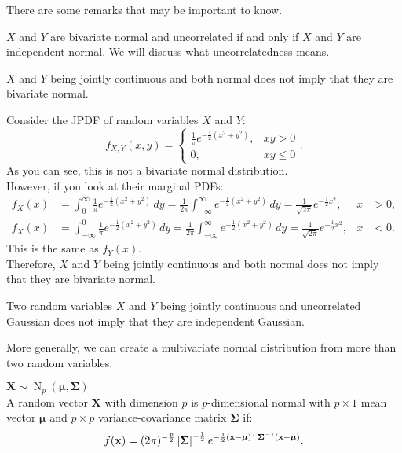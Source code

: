 \documentclass{huhtakm-template-book-v2}
\DeclareMathOperator{\N}{N}
\begin{document}
    There are some remarks that may be important to know.
    \begin{rem}
        $X$ and $Y$ are bivariate normal and uncorrelated if and only if $X$ and $Y$ are independent normal. We will discuss what uncorrelatedness means.
    \end{rem}
    \begin{rem}
        $X$ and $Y$ being jointly continuous and both normal does not imply that they are bivariate normal.
    \end{rem}
    \begin{eg}
        Consider the JPDF of random variables $X$ and $Y$:
        \begin{equation*}
            f_{X,Y}(x, y) = \begin{cases}
                \frac{1}{\pi}e^{-\frac{1}{2}(x^{2}+y^{2})}, &xy > 0\\
                0, &xy \leq 0
            \end{cases}.
        \end{equation*}
        As you can see, this is not a bivariate normal distribution.\\
        However, if you look at their marginal PDFs:
        \begin{align*}
            f_{X}(x) &= \int_{0}^{\infty}\frac{1}{\pi}e^{-\frac{1}{2}(x^{2}+y^{2})}\,dy = \frac{1}{2\pi}\int_{-\infty}^{\infty} e^{-\frac{1}{2}(x^{2}+y^{2})}\,dy = \frac{1}{\sqrt{2\pi}}e^{-\frac{1}{2}x^{2}}, & x &> 0,\\
            f_{X}(x) &= \int_{-\infty}^{0}\frac{1}{\pi}e^{-\frac{1}{2}(x^{2}+y^{2})}\,dy = \frac{1}{2\pi}\int_{-\infty}^{\infty} e^{-\frac{1}{2}(x^{2}+y^{2})}\,dy = \frac{1}{\sqrt{2\pi}}e^{-\frac{1}{2}x^{2}}, & x &< 0.
        \end{align*}
        This is the same as $f_{Y}(x)$.\\
        Therefore, $X$ and $Y$ being jointly continuous and both normal does not imply that they are bivariate normal.
    \end{eg}
    \begin{rem}
        Two random variables $X$ and $Y$ being jointly continuous and uncorrelated Gaussian does not imply that they are independent Gaussian.
    \end{rem}
    More generally, we can create a multivariate normal distribution from more than two random variables.
    \begin{eg} $\mathbf{X} \sim \N_{p}(\boldsymbol{\mu},\mathbf{\Sigma})$\\
        A random vector $\mathbf{X}$ with dimension $p$ is $p$-dimensional normal with $p\times 1$ mean vector $\boldsymbol{\mu}$ and $p\times p$ variance-covariance matrix $\mathbf{\Sigma}$ if:
        \begin{equation*}
            f(\mathbf{x}) = (2\pi)^{-\frac{p}{2}}\left|{\mathbf{\Sigma}}\right|^{-\frac{1}{2}}e^{-\frac{1}{2}(\mathbf{x}-\boldsymbol{\mu})^{T}\mathbf{\Sigma}^{-1}(\mathbf{x}-\boldsymbol{\mu})}.
        \end{equation*}
    \end{eg}
\end{document}
